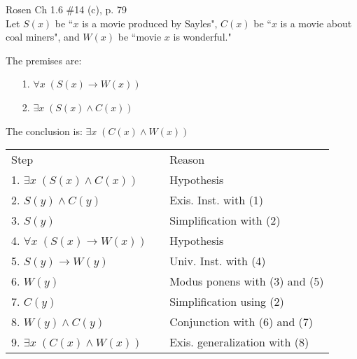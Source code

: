 \documentclass[11pt,addpoints]{exam}
\begin{document}
\begin{questions}
\question[8] Rosen Ch 1.6 \#14 (c), p. 79 \\
Let $S(x)$ be ``$x$ is a movie produced by Sayles", $C(x)$ be ``$x$ is a movie about coal miners", and $W(x)$ be ``movie $x$ is wonderful."  
   \ifprintanswers
        \vspace{-15pt}
    \fi
\begin{solution}
 	The premises are:
    \begin{itemize}[itemsep=0pt,parsep=0pt,topsep=0pt,partopsep=0pt]
        \item[1.] $\forall x\; (S(x) \rightarrow W(x))$
        \item[2.] $\exists x\; (S(x) \wedge C(x))$
    \end{itemize}
    The conclusion is: $\exists x\; (C(x) \wedge W(x))$

    \smallskip
    \begin{tabular}{lll}
        Step        & \hspace{0.2in} & Reason \\
        1. $\exists x\; (S(x) \wedge C(x))$  &   & Hypothesis \\
        2. $S(y) \wedge C(y)$               &   & Exis. Inst. with (1) \\
        3. $S(y)$                           &   & Simplification with (2) \\
        4. $\forall x\; (S(x) \rightarrow W(x))$ &  & Hypothesis \\
        5. $S(y) \rightarrow W(y)$          & & Univ. Inst. with (4) \\
        6. $W(y)$                           & & Modus ponens with (3) and (5) \\
        7. $C(y)$                           & & Simplification using (2) \\
        8. $W(y) \wedge C(y)$               & & Conjunction with (6) and (7) \\
        9. $\exists x\; (C(x) \wedge W(x))$ &   & Exis. generalization with (8) \\
    \end{tabular}
\end{solution}



\end{questions}
\end{document}
